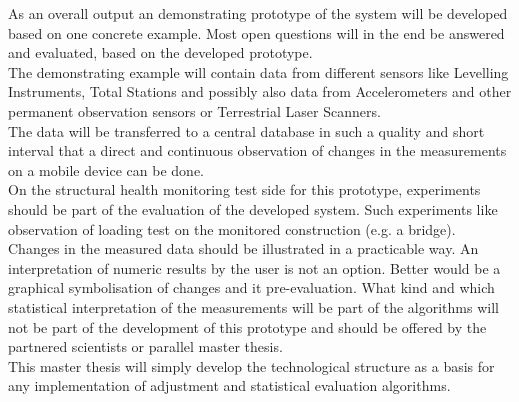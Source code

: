 As an overall output an demonstrating prototype of the system will be developed based on one concrete example. Most open questions will in the end be answered and evaluated, based on the developed prototype.\\
The demonstrating example will contain data from different sensors like Levelling Instruments, Total Stations and possibly also data from Accelerometers and other permanent observation sensors or Terrestrial Laser Scanners.\\
The data will be transferred to a central database in such a quality and short interval that a direct and continuous observation of changes in the measurements on a mobile device can be done.\\
On the structural health monitoring test side for this prototype, experiments should be part of the evaluation of the developed system. Such experiments like observation of loading test on the monitored construction (e.g. a bridge). \\
Changes in the measured data should be illustrated in a practicable way. An interpretation of numeric results by the user is not an option. Better would be a graphical symbolisation of changes and it pre-evaluation. What kind and which statistical interpretation of the measurements will be part of the algorithms will not be part of the development of this prototype and should be offered by the partnered scientists or parallel master thesis.\\
This master thesis will simply develop the technological structure as a basis for any implementation of adjustment and statistical evaluation algorithms.\\
